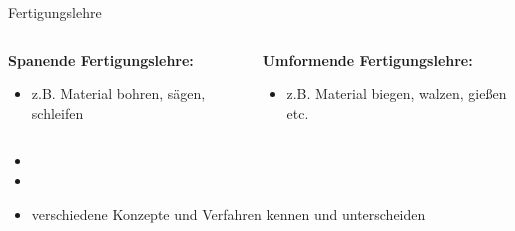 \documentclass[11pt]{beamer}
\begin{document}
\begin{frame}{Fertigungslehre}

\begin{columns}[T] %
\begin{column}{.5\textwidth}

\textbf{Spanende Fertigungslehre:} \\
\begin{itemize}
\item z.B. Material bohren, sägen, schleifen
\end{itemize}


\end{column}%
\hfill%
\begin{column}{.5\textwidth}


\textbf{Umformende Fertigungslehre:} \\
\begin{itemize}
\item z.B. Material biegen, walzen, gießen etc.
\end{itemize}


\end{column}%
\end{columns}

\begin{itemize}
\item[]
\item[]
\item verschiedene Konzepte und Verfahren kennen und unterscheiden
\end{itemize}
	
\end{frame}







\end{document}
